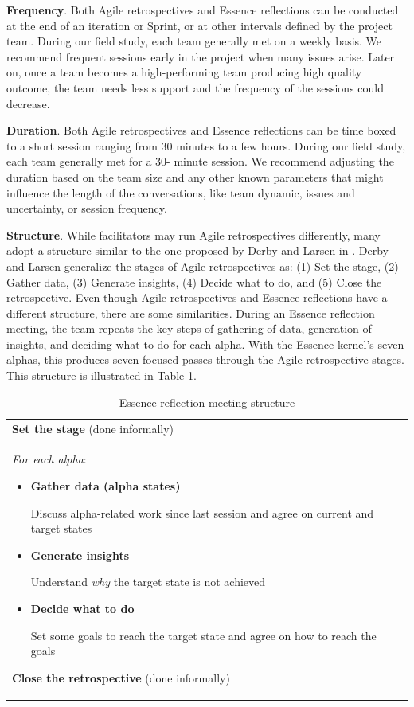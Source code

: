 \textbf{Frequency}. Both Agile retrospectives and Essence reflections can be conducted at the end of an iteration or Sprint, or at other intervals defined by the project team. During our field study, each team generally met on a weekly basis. We recommend frequent sessions early in the project when many issues arise. Later on, once a team becomes a high-performing team producing high quality outcome, the team needs less support and the frequency of the sessions could decrease.

\textbf{Duration}. Both Agile retrospectives and Essence reflections can be time boxed to a short session ranging from 30 minutes to a few hours. During our field study, each team generally met for a 30- minute session. We recommend adjusting the duration based on the team size and any other known parameters that might influence the length of the conversations, like team dynamic, issues and uncertainty, or session frequency.

\textbf{Structure}. While facilitators may run Agile retrospectives differently, many adopt a structure similar to the one proposed by Derby and Larsen in \cite{Derby2006}. Derby and Larsen generalize the stages of Agile retrospectives as: (1) Set the stage, (2) Gather data, (3) Generate insights, (4) Decide what to do, and (5) Close the retrospective. Even though Agile retrospectives and Essence reflections have a different structure, there are some similarities. During an Essence reflection meeting, the team repeats the key steps of gathering of data, generation of insights, and deciding what to do for each alpha. With the Essence kernel's seven alphas, this produces seven focused passes through the Agile retrospective stages. This structure is illustrated in Table \ref{ReflectionMeetingStructure}.

\begin{table}[t]
\renewcommand{\arraystretch}{1.5}
\centering
\caption{Essence reflection meeting structure}
\label{ReflectionMeetingStructure}
\begin{tabular}{p{3in}}
\hline
\textbf{Set the stage} (done informally) \\
\textit{For each alpha}:
  \begin{itemize}
  \item \textbf{Gather data (alpha states)} 
  
   Discuss alpha-related work since last session
   and agree on current and target states
  
  \item \textbf{Generate insights}

  Understand \textit{why} the target state is not achieved
  
  \item \textbf{Decide what to do}
  
  Set some goals to reach the target state 
  and agree on how to reach the goals

  \end{itemize}
    
\textbf{Close the retrospective} (done informally) \\
\hline
\end{tabular}
\end{table}


